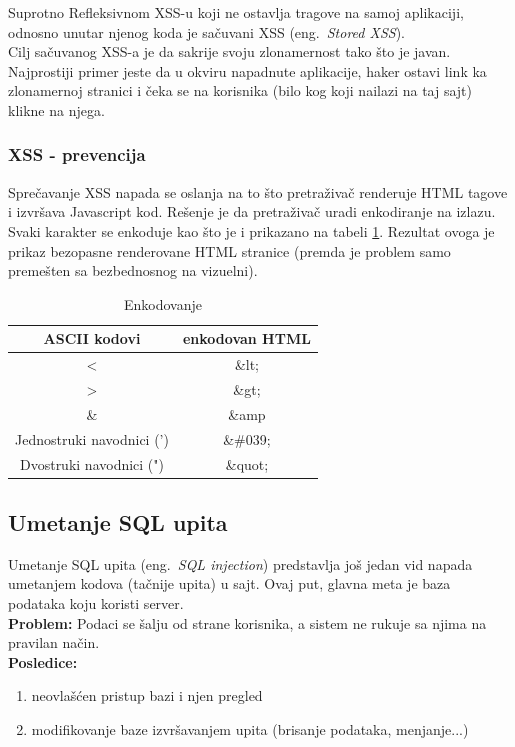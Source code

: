 \documentclass[a4paper]{article}
\begin{document}
Suprotno Refleksivnom XSS-u koji ne ostavlja tragove na samoj aplikaciji, odnosno unutar njenog koda je sačuvani XSS (eng.~{\em Stored XSS}).\\ Cilj sačuvanog XSS-a je da sakrije svoju zlonamernost tako što je javan. Najprostiji primer jeste da u okviru napadnute aplikacije, haker ostavi link ka zlonamernoj stranici i čeka se na korisnika (bilo kog koji nailazi na taj sajt) klikne na njega.

\subsubsection{XSS - prevencija}

Sprečavanje XSS \cite{XSS_prev} napada se oslanja na to što pretraživač renderuje HTML tagove i izvršava Javascript kod. Rešenje je da pretraživač uradi enkodiranje na izlazu. Svaki karakter se enkoduje kao što je i prikazano na tabeli \ref{kodiranje}. Rezultat ovoga je prikaz bezopasne renderovane HTML stranice (premda je problem samo premešten sa bezbednosnog na vizuelni).

\begin{table}[ht]

\begin{center}
\caption{Enkodovanje}
\begin{tabular}{ | c | c | }
\hline
	\rowcolor{yellow}
\textbf{ASCII kodovi} & \textbf{enkodovan HTML} \\
	\hline
 < & \&lt; \\ 
 \hline
 > & \&gt; \\  
 \hline
 \& & \&amp \\
 \hline
 Jednostruki navodnici (') & \&\#039;\\
 \hline
 Dvostruki navodnici (") & \&quot;\\  
 \hline  
\end{tabular}

\label{kodiranje}
\end{center}
\end{table}

\subsection{Umetanje SQL upita}

Umetanje SQL upita (eng.~{\em SQL injection}) \cite{SQL} predstavlja još jedan vid napada umetanjem kodova (tačnije upita) u sajt. Ovaj put, glavna meta je baza podataka koju koristi server.\\
\textbf{Problem:} Podaci se šalju od strane korisnika, a sistem ne rukuje sa njima na pravilan način.\\
\textbf{Posledice:} 
\begin{enumerate}
	\item neovlašćen pristup bazi i njen pregled
	\item modifikovanje baze izvršavanjem upita (brisanje podataka, menjanje...)
\end{enumerate}
\end{document}
